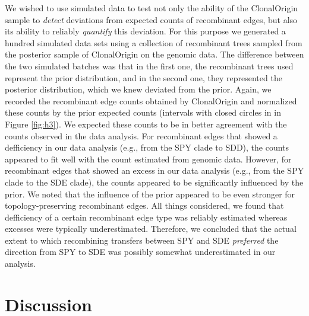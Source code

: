 \documentclass[10pt]{article}
\begin{document}
We wished to use simulated data to test not only the ability of the ClonalOrigin
sample to \textit{detect} deviations from expected counts of recombinant edges, but
also its ability to reliably \textit{quantify} this deviation. For this purpose we
generated a hundred simulated data sets using a collection of recombinant trees
sampled from the posterior sample of ClonalOrigin on the genomic data. The
difference between the two simulated batches was that in the first one, the
recombinant trees used represent the prior distribution, and in the second one,
they represented the posterior distribution, which we knew deviated from the
prior. Again, we recorded the recombinant edge counts obtained by ClonalOrigin
and normalized these counts by the prior expected counts (intervals with closed
circles in in Figure \ref{fig:h3}). We expected these counts to be in better agreement with
the counts observed in the data analysis. For recombinant edges that showed a
defficiency in our data analysis (e.g., from the SPY clade to SDD), the counts
appeared to fit well with the count estimated from genomic data. However, for
recombinant edges that showed an excess in our data analysis (e.g., from the SPY
clade to the SDE clade), the counts appeared to be significantly influenced by the
prior. We noted that the influence of the prior appeared to be even stronger for
topology-preserving recombinant edges. All things considered, we found that defficiency of
a certain recombinant edge type was reliably estimated whereas excesses were 
typically underestimated. Therefore, we concluded that the actual extent to which
recombining transfers between SPY and SDE \textit{preferred} the direction from SPY to
SDE was possibly somewhat underestimated in our analysis.

\section*{Discussion}
\end{document}
